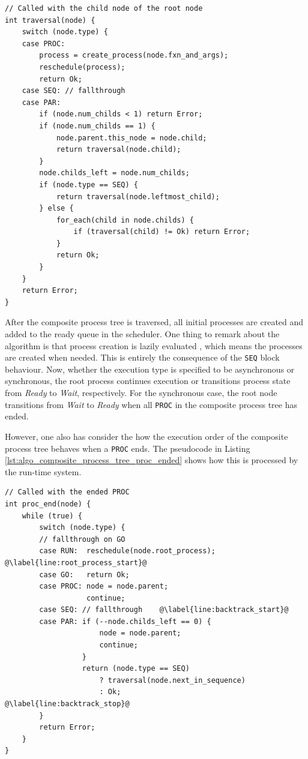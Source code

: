 \noindent\begin{minipage}{\textwidth}
\begin{lstlisting}[style=CustomC,caption={Pseudo code for the composite process tree traversal algorithm},label={lst:algo_composite_process_tree_traversal}]
// Called with the child node of the root node
int traversal(node) {
	switch (node.type) {
	case PROC:
		process = create_process(node.fxn_and_args);
		reschedule(process);
		return Ok;
	case SEQ: // fallthrough
	case PAR:
	    if (node.num_childs < 1) return Error;
	    if (node.num_childs == 1) {
	        node.parent.this_node = node.child;
	        return traversal(node.child);
	    }
		node.childs_left = node.num_childs;
		if (node.type == SEQ) {
			return traversal(node.leftmost_child);
		} else {
		    for_each(child in node.childs) {
		    	if (traversal(child) != Ok) return Error;
		    }
		    return Ok;
		}
	}
	return Error;
}
\end{lstlisting}
\end{minipage}

After the composite process tree is traversed, all initial processes are created and added to the ready queue in the scheduler. One thing to remark about the algorithm is that process creation is lazily evaluated \citep{lazyevaluation}, which means the processes are created when needed. This is entirely the consequence of the \texttt{SEQ} block behaviour. 
Now, whether the execution type is specified to be asynchronous or synchronous, the root process continues execution or transitions process state from \textit{Ready} to \textit{Wait}, respectively. For the synchronous case, the root node transitions from \textit{Wait} to \textit{Ready} when all \texttt{PROC} in the composite process tree has ended. 

However, one also has consider the how the execution order of the composite process tree behaves when a \texttt{PROC} ends. The pseudocode in Listing \ref{lst:algo_composite_process_tree_proc_ended} shows how this is processed by the run\hyp{}time system.

\noindent\begin{minipage}{\textwidth}
\begin{lstlisting}[style=CustomC,caption={Pseudocode for the composite process tree \texttt{PROC} ended algorithm},label={lst:algo_composite_process_tree_proc_ended}]
// Called with the ended PROC
int proc_end(node) {
	while (true) {
		switch (node.type) {
		// fallthrough on GO 
		case RUN:  reschedule(node.root_process);  @\label{line:root_process_start}@
		case GO:   return Ok;
		case PROC: node = node.parent;
			       continue;
		case SEQ: // fallthrough    @\label{line:backtrack_start}@
		case PAR: if (--node.childs_left == 0) {
			          node = node.parent;
			          continue;
			      }
			      return (node.type == SEQ)
			          ? traversal(node.next_in_sequence)
				      : Ok;               @\label{line:backtrack_stop}@
		}
		return Error;
	}
}
\end{lstlisting}
\end{minipage}

